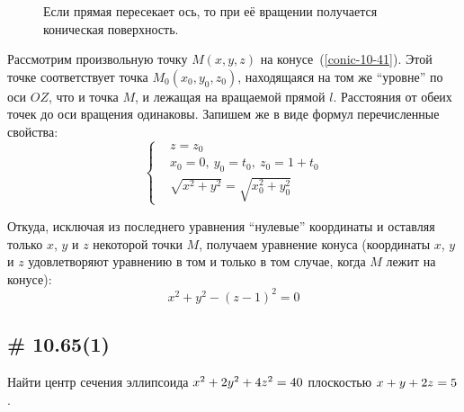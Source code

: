 \documentclass[a4paper,12pt]{article}
\begin{document}
\begin{solution}
\begin{figure}[h]
      \caption{Если прямая пересекает ось, то при её вращении получается коническая поверхность.}
      \label{fig:conic-10-41}
    \end{figure}
    
    Рассмотрим произвольную точку $M(x, y, z)$ на конусе~(\ref{conic-10-41}).
    Этой точке соответствует точка $M_0(x_0, y_0, z_0)$, находящаяся на том же ``уровне'' по оси $OZ$, что и точка $M$, и лежащая на вращаемой прямой $l$.
    Расстояния от обеих точек до оси вращения одинаковы.
    Запишем же в виде формул перечисленные свойства:
    \[
      \left\{
        \begin{aligned}
          &z = z_0\\
          &x_0 = 0,\ y_0 = t_0,\ z_0 = 1 + t_0\\
          &\sqrt{x^2 + y^2} = \sqrt{x_0^2 + y_0^2}
        \end{aligned}
      \right.
    \]
    
    Откуда, исключая из последнего уравнения ``нулевые'' координаты и оставляя только $x$, $y$ и $z$ некоторой точки $M$, получаем уравнение конуса (координаты $x$, $y$ и $z$ удовлетворяют уравнению в том и только в том случае, когда $M$ лежит на конусе):
    \[
      x^2 + y^2 - (z - 1)^2 = 0
    \]
  \end{solution}


  \subsection{\# 10.65(1)}
  
  Найти центр сечения эллипсоида
  $
    x^2 \hm+ 2y^2 \hm+ 4z^2 \hm= 40
  $
  плоскостью
  $
    x + y + 2z \hm= 5
  $.
  
\end{document}
